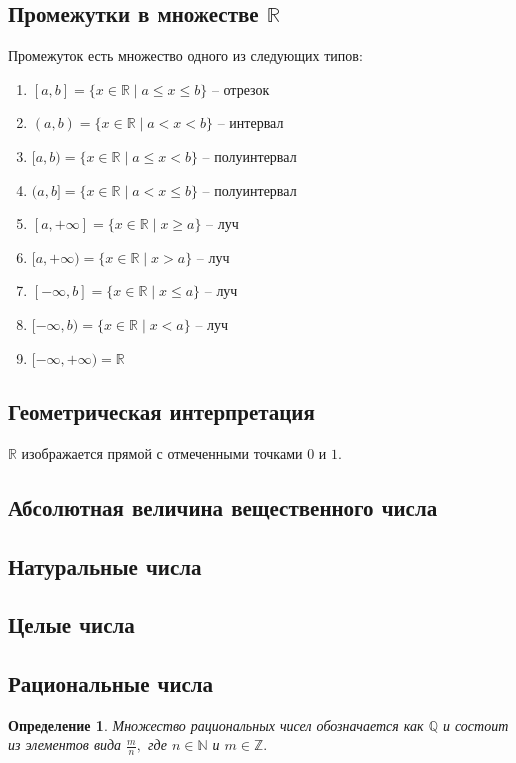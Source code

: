\documentclass{article}
\newtheorem{Definition}{Определение}[section]
\begin{document}
\subsection{Промежутки в множестве $\mathbb{R}$}
Промежуток есть множество одного из следующих типов:
\begin{enumerate}
\item $[a,b] =\{x\in\mathbb{R}\mid a\leq x\leq b\}$ -- отрезок
\item $(a,b) =\{x\in\mathbb{R}\mid a< x< b\}$ -- интервал
\item $[a,b) =\{x\in\mathbb{R}\mid a\leq x< b\}$ -- полуинтервал
\item $(a,b] =\{x\in\mathbb{R}\mid a< x\leq b\}$ -- полуинтервал
\item $[a, +\infty] =\{x\in\mathbb{R}\mid x\geq a\}$ -- луч
\item $[a,+\infty) =\{x\in\mathbb{R}\mid x>a\}$ -- луч
\item $[-\infty,b] =\{x\in\mathbb{R}\mid x\leq a\}$ -- луч
\item $[-\infty,b) =\{x\in\mathbb{R}\mid x<a\}$ -- луч
\item $[-\infty,+\infty) =\mathbb{R}$ 
\end{enumerate}
\subsection{Геометрическая интерпретация}
$\mathbb{R}$ изображается прямой с отмеченными точками $0$ и $1.$
\subsection{Абсолютная величина вещественного числа}

\subsection{Натуральные числа}

\subsection{Целые числа}

\subsection{Рациональные числа}

\begin{Definition}
Множество рациональных чисел обозначается как $\mathbb{Q}$ и состоит из элементов вида $\frac{m}{n},$ где $n\in \mathbb{N}$ и $m\in\mathbb{Z}.$
\end{Definition}
\end{document}
